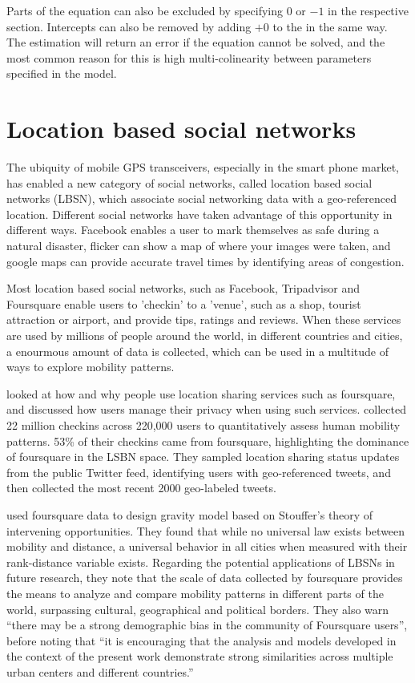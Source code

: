 Parts of the equation can also be excluded by specifying $0$ or $-1$ in the respective section. Intercepts can also be removed by adding $+ 0$ to the in the same way. The estimation will return an error if the equation cannot be solved, and the most common reason for this is high multi-colinearity between parameters specified in the model.

\section{Location based social networks}
The ubiquity of mobile GPS transceivers, especially in the smart phone market, has enabled a new category of social networks, called location based social networks (LBSN), which associate social networking data with a geo-referenced location. Different social networks have taken advantage of this opportunity in different ways. Facebook enables a user to mark themselves as safe during a natural disaster, flicker can show a map of where your images were taken, and google maps can provide accurate travel times by identifying areas of congestion. 

Most location based social networks, such as Facebook, Tripadvisor and Foursquare enable users to 'checkin' to a 'venue', such as a shop, tourist attraction or airport, and provide tips, ratings and reviews. When these services are used by millions of people around the world, in different countries and cities, a enourmous amount of data is collected, which can be used in a multitude of ways to explore mobility patterns. 

\textcite{lindqvist2011m} looked at how and why people use location sharing services such as foursquare, and discussed how users manage their privacy when using such services. \autocite{cheng2011exploring} collected 22 million checkins across 220,000 users to quantitatively assess human mobility patterns. 53\% of their checkins came from foursquare, highlighting the dominance of foursquare in the LSBN space. They sampled location sharing status updates from the public Twitter feed, identifying users with geo-referenced tweets, and then collected the most recent 2000 geo-labeled tweets.

\textcite{noulas2012tale} used foursquare data to design gravity model based on Stouffer's theory of intervening opportunities\parencite{stouffer1940intervening}. They found that while no universal law exists between mobility and distance, a universal behavior in all cities when measured with their rank-distance variable exists. Regarding the potential applications of LBSNs in future research, they note that the scale of data collected by foursquare provides the means to analyze and compare mobility patterns in different parts of the world, surpassing cultural, geographical and political borders. They also warn \enquote{there may be a strong demographic bias in the community of Foursquare users}, before noting that \enquote{it is encouraging that the analysis and models developed in the context of the present work demonstrate strong similarities across multiple urban centers and different countries.}

